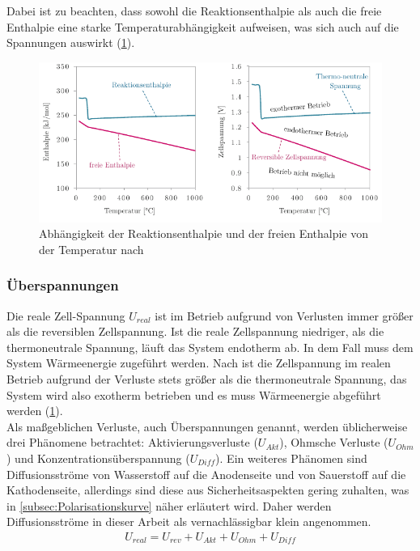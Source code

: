 Dabei ist zu beachten, dass sowohl die Reaktionsenthalpie als auch die freie Enthalpie eine starke Temperaturabhängigkeit aufweisen, was sich auch auf die Spannungen auswirkt (\ref{fig:Entropien}).

\begin{figure}[h]
	\centering
		\includegraphics[scale=1]{Figures/VerlaufVonEntropien}
		\caption{Abhängigkeit der Reaktionsenthalpie und der freien Enthalpie von der Temperatur nach \citet{tremel_electrolysisfundamental_2018}}
\label{fig:Entropien}	
\end{figure}

\subsubsection{Überspannungen}
\label{subsubsec:Überspannungen}
Die reale Zell-Spannung $U_{real}$ ist im Betrieb aufgrund von Verlusten immer größer als die reversiblen Zellspannung. Ist die reale Zellspannung niedriger, als die thermoneutrale Spannung, läuft das System endotherm ab. In dem Fall muss dem System Wärmeenergie zugeführt werden. Nach \citet{olivier_low-temperature_2017} ist die Zellspannung im realen Betrieb aufgrund der Verluste stets größer als die thermoneutrale Spannung, das System wird also exotherm betrieben und es muss Wärmeenergie abgeführt werden (\ref{fig:Entropien}).\\
Als maßgeblichen Verluste, auch Überspannungen genannt, werden üblicherweise drei Phänomene betrachtet: Aktivierungsverluste ($U_{Akt}$), Ohmsche Verluste ($U_{Ohm}$) und Konzentrationsüberspannung ($U_{Diff}$)\citep{falcao_review_2020}. Ein weiteres Phänomen sind Diffusionsströme von Wasserstoff auf die Anodenseite und von Sauerstoff auf die Kathodenseite, allerdings sind diese aus Sicherheitsaspekten gering zuhalten, was in \ref{subsec:Polarisationskurve} näher erläutert wird. Daher werden Diffusionsströme in dieser Arbeit als vernachlässigbar klein angenommen. 
\begin{align}
	\label{gl:U_real}
	U_{real} =  U_{rev} + U_{Akt} + U_{Ohm} + U_{Diff}
\end{align}   

